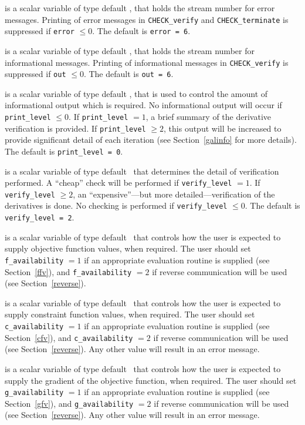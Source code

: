 \documentclass{galahad}
\newcommand{\packagename}{CHECK}
\begin{document}
\begin{description}

 is a scalar variable of type default \integer, that holds the
stream number for error messages. Printing of error messages in 
{\tt \packagename\_verify} and {\tt \packagename\_terminate} 
is suppressed if {\tt error} $\leq 0$.
The default is {\tt error = 6}.

 is a scalar variable of type default \integer, that holds the
stream number for informational messages. Printing of informational messages in 
{\tt \packagename\_verify} is suppressed if {\tt out} $\leq 0$.
The default is {\tt out = 6}.

 is a scalar variable of type default \integer, that is used
to control the amount of informational output which is required. No 
informational output will occur if {\tt print\_level} $\leq 0$. If 
{\tt print\_level} $= 1$, a brief summary of the derivative
verification is provided.  If {\tt print\_level} $\geq 2$, this output will be
increased to provide significant detail of each iteration (see
Section~\ref{galinfo} for more details).
The default is {\tt print\_level = 0}.

 is a scalar variable of type default \integer\
that determines the detail of verification performed.  A ``cheap''
check will be performed if {\tt verify\_level} $= 1$. If 
{\tt verify\_level} $\geq 2$, an ``expensive''---but more
detailed---verification of the derivatives is done.  No
checking is performed if {\tt verify\_level} $\leq 0$.
The default is {\tt verify\_level = 2}.

 is a scalar variable of type default \integer\
that controls how the user is expected to supply objective function
values, when required.  The user should set {\tt f\_availability} $=1$
if an appropriate evaluation routine is supplied (see
Section~\ref{ffv}), and {\tt f\_availability} $=2$ if reverse
communication will be used (see Section~\ref{reverse}).

 is a scalar variable of type default \integer\
that controls how the user is expected to supply constraint function
values, when required.  The user should set {\tt c\_availability} $=1$
if an appropriate evaluation routine is supplied (see
Section~\ref{cfv}), and {\tt c\_availability} $=2$ if reverse
communication will be used (see Section~\ref{reverse}).  Any other
value will result in an error message.

\itt{g\_availability} is a scalar variable of type default \integer\
that controls how the user is expected to supply the gradient of the
objective function, when required.  The user should set {\tt g\_availability} $=1$
if an appropriate evaluation routine is supplied (see
Section~\ref{gfv}), and {\tt g\_availability} $=2$ if reverse
communication will be used (see Section~\ref{reverse}).  Any other
value will result in an error message.


\end{description}
\end{document}
